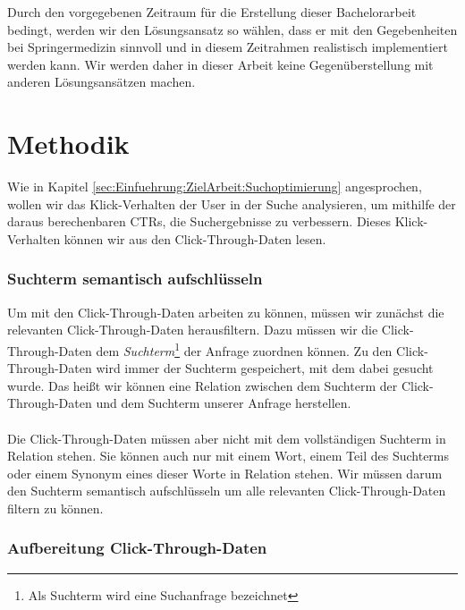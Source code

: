 Durch den vorgegebenen Zeitraum für die Erstellung dieser Bachelorarbeit bedingt, werden wir den Lösungsansatz so wählen, dass er mit den Gegebenheiten bei Springermedizin sinnvoll und in diesem Zeitrahmen realistisch implementiert werden kann. Wir werden daher in dieser Arbeit keine Gegenüberstellung mit anderen Lösungsansätzen machen. 


\section{Methodik}
\label{sec:Einfuehrung:Methodik}

Wie in Kapitel \ref{sec:Einfuehrung:ZielArbeit:Suchoptimierung} angesprochen, wollen wir das Klick-Verhalten der User in der Suche analysieren, um mithilfe der daraus berechenbaren CTRs, die Suchergebnisse zu verbessern. Dieses Klick-Verhalten können wir aus den Click-Through-Daten lesen. 

\subsubsection{Suchterm semantisch aufschlüsseln}
\label{sec:Einfuehrung:Methodik:SuchtermSegmentierung}

Um mit den Click-Through-Daten arbeiten zu können, müssen wir zunächst die relevanten Click-Through-Daten herausfiltern. Dazu müssen wir die Click-Through-Daten dem \textit{Suchterm}\footnote{Als Suchterm wird eine Suchanfrage bezeichnet} der Anfrage zuordnen können. Zu den Click-Through-Daten wird immer der Suchterm gespeichert, mit dem dabei gesucht wurde. Das heißt wir können eine Relation zwischen dem Suchterm der Click-Through-Daten und dem Suchterm unserer Anfrage herstellen.
\\
\\
Die Click-Through-Daten müssen aber nicht mit dem vollständigen Suchterm in Relation stehen. Sie können auch nur mit einem Wort, einem Teil des Suchterms oder einem Synonym eines dieser Worte in Relation stehen. Wir müssen darum den Suchterm semantisch aufschlüsseln um alle relevanten Click-Through-Daten filtern zu können. 

\subsubsection{Aufbereitung Click-Through-Daten}
\label{sec:Einfuehrung:Methodik:Click-Through-Daten}

